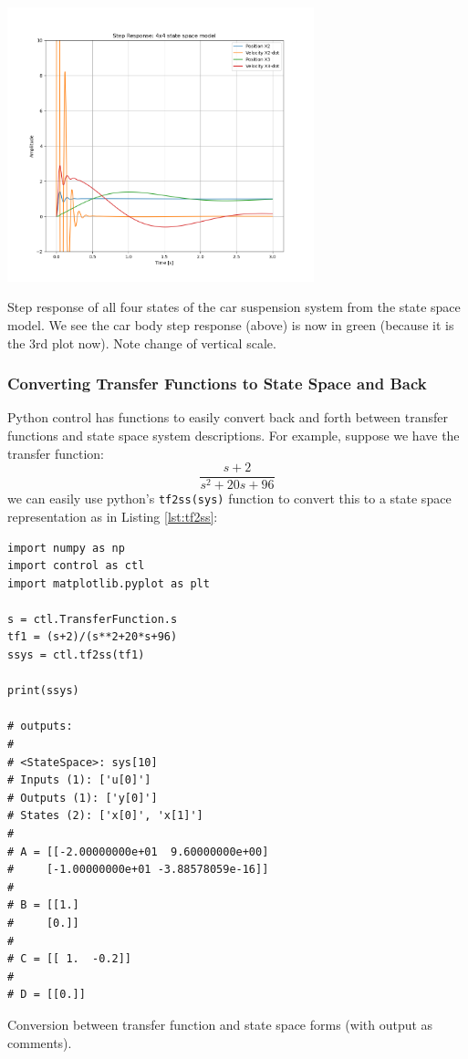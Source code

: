 \begin{ExampleCont}

\begin{center}    \includegraphics[width=3.5in]{figs08/all4StepResponsesCarBody.png}

    {Step response of all four states of the car suspension system from the state space model. We see the car body step response (above) is now in green (because it is the 3rd plot now).  Note change of vertical scale. }
\end{center}

\end{ExampleCont}


\subsubsection{Converting Transfer Functions to State Space and Back}

Python control has functions to easily convert back and forth between transfer functions and state space system descriptions.   For example, suppose we have the transfer function:
\[
\frac{s+2}{s^2+20s+96}
\]
we can easily use python's {\tt tf2ss(sys)} function
to convert this to a state space representation as in Listing \ref{lst:tf2ss}:



\begin{listing}
    \begin{verbatim}
import numpy as np
import control as ctl
import matplotlib.pyplot as plt

s = ctl.TransferFunction.s
tf1 = (s+2)/(s**2+20*s+96)
ssys = ctl.tf2ss(tf1)

print(ssys)

# outputs:
#
# <StateSpace>: sys[10]
# Inputs (1): ['u[0]']
# Outputs (1): ['y[0]']
# States (2): ['x[0]', 'x[1]']
#
# A = [[-2.00000000e+01  9.60000000e+00]
#     [-1.00000000e+01 -3.88578059e-16]]
#
# B = [[1.]
#     [0.]]
#
# C = [[ 1.  -0.2]]
#
# D = [[0.]]
\end{verbatim}
\caption{Conversion between transfer function and state space forms (with output as comments).}
\label{lst:ss2tf}
\end{listing}



